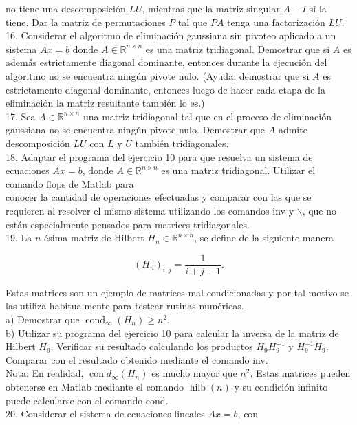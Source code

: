 \documentclass[10pt]{book}
\begin{document}
no tiene una descomposición $L U$, mientras que la matriz singular $A-I$ sí la tiene. Dar la matriz de permutaciones $P$ tal que $P A$ tenga una factorización $L U$.\\
16. Considerar el algoritmo de eliminación gaussiana sin pivoteo aplicado a un sistema $A x=b$ donde $A \in \mathbb{R}^{n \times n}$ es una matriz tridiagonal. Demostrar que si $A$ es además estrictamente diagonal dominante, entonces durante la ejecución del algoritmo no se encuentra ningún pivote nulo. (Ayuda: demostrar que si $A$ es estrictamente diagonal dominante, entonces luego de hacer cada etapa de la eliminación la matriz resultante también lo es.)\\
17. Sea $A \in \mathbb{R}^{n \times n}$ una matriz tridiagonal tal que en el proceso de eliminación gaussiana no se encuentra ningún pivote nulo. Demostrar que $A$ admite descomposición $L U$ con $L$ y $U$ también tridiagonales.\\
18. Adaptar el programa del ejercicio 10 para que resuelva un sistema de ecuaciones $A x=b$, donde $A \in \mathbb{R}^{n \times n}$ es una matriz tridiagonal. Utilizar el comando flops de Matlab para\\
conocer la cantidad de operaciones efectuadas y comparar con las que se requieren al resolver el mismo sistema utilizando los comandos inv y $\backslash$, que no están especialmente pensados para matrices tridiagonales.\\
19. La $n$-ésima matriz de Hilbert $H_{n} \in \mathbb{R}^{n \times n}$, se define de la siguiente manera

$$
\left(H_{n}\right)_{i, j}=\frac{1}{i+j-1} .
$$

Estas matrices son un ejemplo de matrices mal condicionadas y por tal motivo se las utiliza habitualmente para testear rutinas numéricas.\\
a) Demostrar que $\operatorname{cond}_{\infty}\left(H_{n}\right) \geq n^{2}$.\\
b) Utilizar su programa del ejercicio 10 para calcular la inversa de la matriz de Hilbert $H_{9}$. Verificar su resultado calculando los productos $H_{9} H_{9}^{-1}$ y $H_{9}^{-1} H_{9}$. Comparar con el resultado obtenido mediante el comando inv.\\
Nota: En realidad, $\operatorname{con} d_{\infty}\left(H_{n}\right)$ es mucho mayor que $n^{2}$. Estas matrices pueden obtenerse en Matlab mediante el comando $\operatorname{hilb}(n)$ y su condición infinito puede calcularse con el comando cond.\\
20. Considerar el sistema de ecuaciones lineales $A x=b$, con
\end{document}
